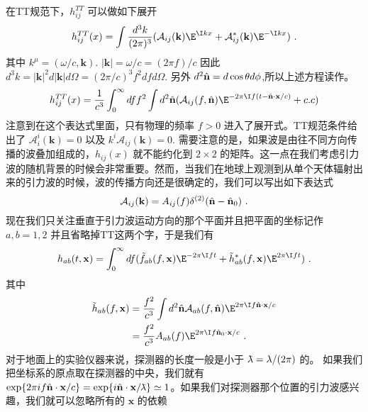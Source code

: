 在TT规范下，$h^{TT}_{ij}$ 可以做如下展开
\begin{equation}
h^{TT}_{ij}(x) = \int \frac{d^3 k}{(2\pi)^3} (\mathcal A_{ij}(\mathbf k) \E^{\I kx} + \mathcal A_{ij}^* (\mathbf k) \E^{-\I k x} ) ~. 
\end{equation}
其中 $k^\mu = (\omega/c,\mathbf k)$. $|\mathbf k| = \omega/c = (2\pi f)/c$ 因此 $d^3 k = |\mathbf k|^2 d|\mathbf k| d\Omega = (2\pi/c)^3 f^2 df d\Omega $. 另外 $d^2\hat{\bf{n}} = d\cos\theta d\phi$,所以上述方程读作。
\begin{equation}\label{TTGaug_eq4}
h^{TT}_{ij}(x) = \frac{1}{c^3} \int^\infty_0 df f^2 \int d^2 \hat{ \bf{n} } ( \mathcal A_{ij} (f,\hat{ \bf{n} }) \E^{-2\pi \I f(t-\hat{ {\bf n} } \cdot {\bf x} /c  )}  + {c.c} ) 
\end{equation}
注意到在这个表达式里面，只有物理的频率 $f>0$ 进入了展开式。TT规范条件给出了 $\mathcal A^i_i (\mathbf k) =0 $ 以及 $k^i \mathcal A_{ij} (\mathbf k) =0 $. 需要注意的是，如果波是由往不同方向传播的波叠加组成的，$h_{ij}(x)$ 就不能约化到 $2\times 2$ 的矩阵。这一点在我们考虑引力波的随机背景的时候会非常重要。然而，当我们在地球上观测到从单个天体辐射出来的引力波的时候，波的传播方向还是很确定的，我们可以写出如下表达式
\begin{equation}
\mathcal A_{ij} (\mathbf k) = A_{ij} (f) \delta^{(2)} (\hat{  \mathbf n } - \hat{ {\bf n} }_0 )~.
\end{equation}
现在我们只关注垂直于引力波运动方向的那个平面并且把平面的坐标记作 $a,b = 1,2$ 并且省略掉TT这两个字，于是我们有
\begin{equation}
h_{ab} (t,\mathbf x ) = \int^\infty_0 df ( \tilde f_{ab} (f,\mathbf x) \E^{-2\pi \I f t} + \tilde h^*_{ab} (f,\mathbf x) \E^{2\pi \I f t} ) ~. 
\end{equation}
其中
\begin{equation}
\begin{aligned}
\tilde h_{ab} (f,\mathbf x) & = \frac{f^2}{c^3} \int d^2 \hat{  \mathbf n } \mathcal A_{ab} (f, \hat{\mathbf{n}}) \E^{2\pi \I f \hat{  \mathbf n } \cdot \mathbf x / c  } \\
& = \frac{f^2}{c^3} A_{ab} (f) \E^{2\pi \I f {\hat{\mathbf n}_0 \cdot \mathbf x /c  } }~.
\end{aligned}
\end{equation} 
对于地面上的实验仪器来说，探测器的长度一般是小于 ${\mkern0.7mu {\bar{\phantom{a}}} \mkern -11mu\lambda} = \lambda/(2\pi)$ 的。 如果我们把坐标系的原点取在探测器的中央，我们就有 $\exp  \{   2\pi i f \hat{ \mathbf n } \cdot \mathbf x/c \} = \exp \{ i \hat{ {\bf n} } \cdot \mathbf x / {\mkern0.75mu {\bar{\phantom{a}}} \mkern -11.75mu\lambda} \} \simeq 1  $。如果我们对探测器那个位置的引力波感兴趣，我们就可以忽略所有的 $\mathbf x$ 的依赖
